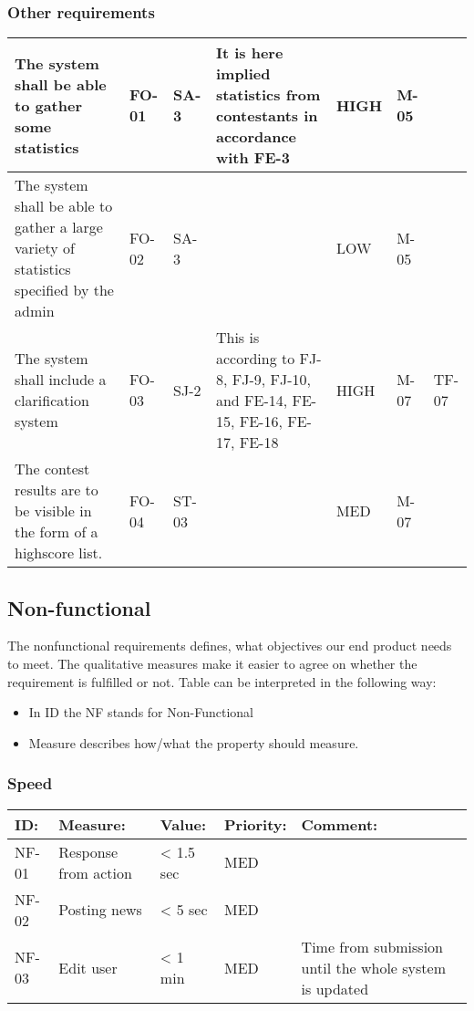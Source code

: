 \subsubsection{Other requirements}
\begin{supertabular}{|m{1.1191599in}|m{0.35875985in}|m{0.33795986in}|m{1.2580599in}|m{0.5045598in}|m{1.1087599in}|m{1.0670599in}|}
\hline
The system shall be able to gather some statistics & FO-01 & SA-3 & It is here
implied statistics from contestants in accordance with FE-3 & HIGH & M-05 &
\\\hline The system shall be able to gather a large variety of statistics
specified by the admin & FO-02 & SA-3 &
 & LOW & M-05 &
\\\hline The system shall include a clarification system & FO-03 & SJ-2 & This
is according to FJ-8, FJ-9, FJ-10, and FE-14, FE-15, FE-16, FE-17, FE-18 & HIGH
& M-07 & TF-07\\\hline The contest results are to be visible in the form of a
highscore list. & FO-04 & ST-03 &
 & MED & M-07 &
\\\hline
\end{supertabular}

\subsection{Non-functional}
The nonfunctional requirements defines, what objectives our end product
needs to meet. The qualitative measures make it easier to agree on
whether the requirement is fulfilled or not. Table can be interpreted in the following way:
\begin{itemize}
    \item In ID the NF stands for Non-Functional
    \item Measure describes how/what the property should measure.
\end{itemize}

\subsubsection{Speed}
\begin{supertabular}{|l|p{5cm}|p{1.8cm}|l|p{4.4cm}|}
\hline
\textbf{ID:} & \textbf{Measure:} & \textbf{Value:} & \textbf{Priority:} & \textbf{Comment:}\\
\hline

NF-01 & Response from action & {\textless} 1.5 sec & MED & \\
\hline

NF-02 & Posting news & {\textless} 5 sec & MED & \\
\hline

NF-03 & Edit user & {\textless} 1 min & MED & Time from submission until the
whole system is updated\\
\hline
\end{supertabular}

